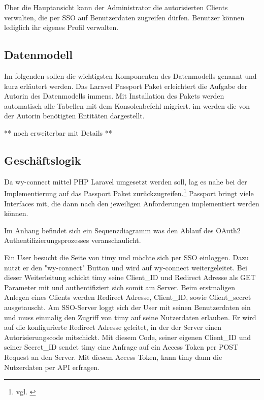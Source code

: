Über die Hauptansicht kann der Administrator die autorisierten Clients verwalten, die per \acs{SSO} auf  Benutzerdaten zugreifen dürfen. Benutzer können lediglich ihr eigenes Profil verwalten.

\subsection{Datenmodell}
\label{sec:Datenmodell}

Im folgenden sollen die wichtigsten Komponenten des Datenmodells genannt und kurz erläutert werden. 
Das Laravel Passport Paket erleichtert die Aufgabe der Autorin des Datenmodells immens. Mit Installation des Pakets werden automatisch alle Tabellen mit dem Konsolenbefehl  migriert. im  werden die von der Autorin benötigten Entitäten dargestellt. 


** noch erweiterbar mit Details **

\subsection{Geschäftslogik}
\label{sec:Geschaeftslogik}

Da wy-connect mittel \acs{PHP} Laravel umgesetzt werden soll, lag es nahe bei der Implementierung auf das Passport Paket zurückzugreifen.\footnote{vgl. \cite{Passport}}
Passport bringt viele Interfaces mit, die dann nach den jeweiligen Anforderungen implementiert werden können. 

Im Anhang  befindet sich ein Sequenzdiagramm was den Ablauf des OAuth2 Authentifizierungsprozesses veranschaulicht. 

Ein User besucht die Seite von timy und möchte sich per \acs{SSO} einloggen. Dazu nutzt er den "wy-connect" Button und wird auf wy-connect weitergeleitet. Bei dieser Weiterleitung schickt timy seine Client\_ID und Redirect Adresse als GET Parameter mit und authentifiziert sich somit am Server. 
Beim erstmaligen Anlegen eines Clients werden Redirect Adresse, Client\_ID, sowie Client\_secret ausgetauscht. 
Am \acs{SSO}-Server loggt sich der User mit seinen Benutzerdaten ein und muss einmalig den Zugriff von timy auf seine Nutzerdaten erlauben. 
Er wird auf die konfigurierte Redirect Adresse geleitet, in der der Server einen Autorisierungscode mitschickt. Mit diesem Code, seiner eigenen Client\_ID und seiner Secret\_ID sendet timy eine Anfrage auf ein Access Token per POST Request an den Server. Mit diesem Access Token, kann timy dann die Nutzerdaten per API erfragen. 

